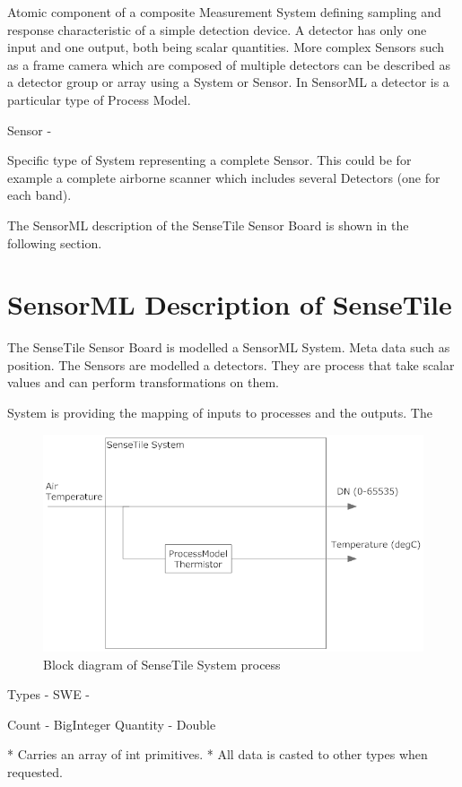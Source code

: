 \documentclass[]{final_report}
\begin{document}
    Atomic component of a composite Measurement System defining sampling and response characteristic of a simple detection device. A detector has only one input and one output, both being scalar quantities. More complex Sensors such as a frame camera which are composed of multiple detectors can be described as a detector group or array using a System or Sensor. In SensorML a detector is a particular type of Process Model.

    Sensor -

    Specific type of System representing a complete Sensor. This could be for example a complete airborne scanner which includes several Detectors (one for each band). 

The SensorML description of the SenseTile Sensor Board is shown in the following section.

\section{SensorML Description of SenseTile}

The SenseTile Sensor Board is modelled a SensorML System. Meta data such as position.
The Sensors are modelled a detectors. They are process that take scalar values
and can perform transformations on them.

System is providing the mapping of inputs to processes and the outputs.
The 
 \begin{figure}
\includegraphics{SensorML_SenseTile_block_design.png}
\caption{Block diagram of SenseTile System process}\label{fig:SensorML_SenseTile_design.png}
\end{figure}


Types
 - SWE -

Count - BigInteger
Quantity - Double

 * Carries an array of int primitives.
 * All data is casted to other types when requested.
\end{document}
